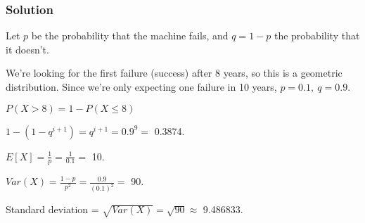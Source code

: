 \documentclass[]{article}
\newenvironment{Shaded}{\begin{snugshade}}{\end{snugshade}}
\newcommand{\KeywordTok}[1]{\textcolor[rgb]{0.13,0.29,0.53}{\textbf{#1}}}
\newcommand{\DataTypeTok}[1]{\textcolor[rgb]{0.13,0.29,0.53}{#1}}
\newcommand{\DecValTok}[1]{\textcolor[rgb]{0.00,0.00,0.81}{#1}}
\newcommand{\FloatTok}[1]{\textcolor[rgb]{0.00,0.00,0.81}{#1}}
\newcommand{\CharTok}[1]{\textcolor[rgb]{0.31,0.60,0.02}{#1}}
\newcommand{\StringTok}[1]{\textcolor[rgb]{0.31,0.60,0.02}{#1}}
\newcommand{\OperatorTok}[1]{\textcolor[rgb]{0.81,0.36,0.00}{\textbf{#1}}}
\newcommand{\NormalTok}[1]{#1}
\begin{document}
\subsubsection{Solution}\label{solution-1}

Let \(p\) be the probability that the machine fails, and \(q = 1 - p\)
the probability that it doesn't.

We're looking for the first failure (success) after 8 years, so this is
a geometric distribution. Since we're only expecting one failure in 10
years, \(p = 0.1, \ q = 0.9\).

\(P(X > 8) = 1 - P(X \leq 8)\)

\(1 - (1 - q^{i+1}) = q^{i+1} = 0.9^{9} =\) 0.3874.

\(E[X] = \frac{1}{p} = \frac{1}{0.1} =\) 10.

\(Var(X) = \frac{1-p}{p^2} = \frac{0.9}{(0.1)^2} =\) 90.

Standard deviation = \(\sqrt{Var(X)} = \sqrt{90} \approx\) 9.486833.

\begin{Shaded}
\end{Shaded}
\end{document}
